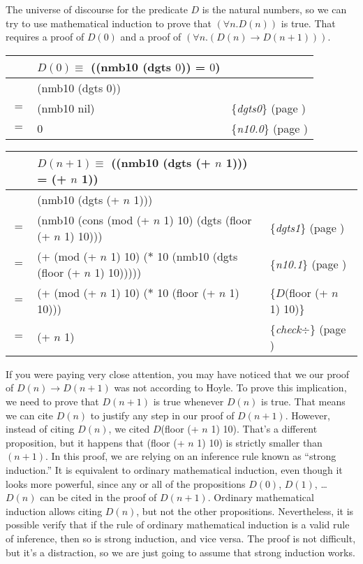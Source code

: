 The universe of discourse
for the predicate $D$ is the natural numbers,
so we can try to use mathematical induction
to prove that $(\forall n.D(n))$ is true.
That requires a proof of $D(0)$ and
a proof of $(\forall n.(D(n) \rightarrow D(n+1)))$.

\begin{center}
\begin{tabular}{lll}
    & $D(0) \equiv$ ((nmb10 (dgts $0$)) = $0$) & \\
    \hline
    & (nmb10 (dgts $0$)) & \\
$=$ & (nmb10 nil)        & \{\emph{dgts0}\} (page \pageref{dgts-defun}) \\
$=$ & 0                  & \{\emph{n10.0}\} (page \pageref{nmb10-defun}) \\
\end{tabular}
\end{center}

\begin{center}
\begin{tabular}{lll}
    & $D(n+1) \equiv$ ((nmb10 (dgts (+ $n$ 1))) = (+ $n$ 1)) & \\
    \hline
    & (nmb10 (dgts (+ $n$ 1)))           & \\
$=$ & (nmb10 (cons (mod (+ $n$ 1) 10) (dgts (floor (+ $n$ 1) 10)))  & \{\emph{dgts1}\} (page \pageref{dgts-defun})\\
$=$ & (+ (mod (+ $n$ 1) 10) ($*$ 10 (nmb10 (dgts (floor (+ $n$ 1) 10)))))  & \{\emph{n10.1}\} (page \pageref{nmb10-defun})\\
$=$ & (+ (mod (+ $n$ 1) 10) ($*$ 10 (floor (+ $n$ 1) 10)))  & \{$D$(floor (+ $n$ 1) 10)\} \\
$=$ & (+ $n$ 1)  & \{\emph{check}$\div$\} (page \pageref{third-grade-division})
\end{tabular}
\end{center}

If you were paying very close attention,
you may have noticed that we our proof of $D(n) \rightarrow D(n+1)$
was not according to Hoyle.
To prove this implication, we need to prove that $D(n+1)$ is true whenever $D(n)$ is true.
That means we can cite $D(n)$ to justify any step in our proof of $D(n+1)$.
However, instead of citing $D(n)$, we cited $D$(floor (+ $n$ 1) 10).
That's a different proposition,
but it happens that (floor (+ $n$ 1) 10) is strictly smaller than $(n+1)$.
In this proof, we are relying on an inference rule
known as ``strong induction.''
It is equivalent to ordinary mathematical induction,
even though it looks more powerful, since any or all of the
propositions $D(0)$, $D(1)$, \dots $D(n)$ can be cited in the proof of $D(n+1)$.
Ordinary mathematical induction allows citing $D(n)$, but not the other
propositions.
Nevertheless, it is possible verify that if the rule of ordinary mathematical induction
is a valid rule of inference, then so is strong induction, and vice versa.
The proof is not difficult, but it's a distraction,
so we are just going to assume that strong induction works.

